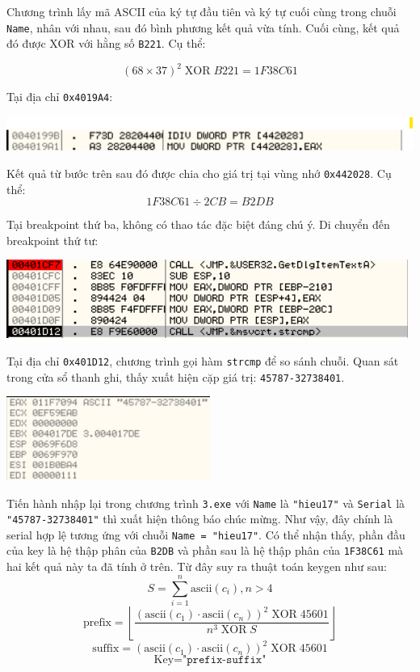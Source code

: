 Chương trình lấy mã ASCII của ký tự đầu tiên và ký tự cuối cùng trong chuỗi \texttt{Name}, nhân với nhau, sau đó bình phương kết quả vừa tính. Cuối cùng, kết quả đó được XOR với hằng số \texttt{B221}. Cụ thể:

\[
(68 \times 37)^2 \;\mathrm{XOR}\; B221 = 1F38C61
\]

Tại địa chỉ \texttt{0x4019A4}:

\begin{center}
    \includegraphics[width=\textwidth]{img/file-3/7.png}
\end{center}

Kết quả từ bước trên sau đó được chia cho giá trị tại vùng nhớ \texttt{0x442028}. Cụ thể: 
\[
    1F38C61 \div 2CB = B2DB
\] 

Tại breakpoint thứ ba, không có thao tác đặc biệt đáng chú ý. Di chuyển đến breakpoint thứ tư:

\begin{center}
    \includegraphics[width=\textwidth]{img/file-3/8.png}
\end{center}

Tại địa chỉ \texttt{0x401D12}, chương trình gọi hàm \texttt{strcmp} để so sánh chuỗi. Quan sát trong cửa sổ thanh ghi, thấy xuất hiện cặp giá trị: \texttt{45787-32738401}.

\begin{center}
    \includegraphics[width=0.5\textwidth]{img/file-3/9.png}
\end{center}

Tiến hành nhập lại trong chương trình \texttt{3.exe} với \texttt{Name} là \texttt{"hieu17"} và \texttt{Serial} là \texttt{"45787-32738401"} thì xuất hiện thông báo chúc mừng. Như vậy, đây chính là serial hợp lệ tương ứng với chuỗi \texttt{Name = "hieu17"}.
Có thể nhận thấy, phần đầu của key là hệ thập phân của \texttt{B2DB} và phần sau là hệ thập phân của \texttt{1F38C61} mà hai kết quả này ta đã tính ở trên.
Từ đây suy ra thuật toán keygen như sau:
\[
S = \sum_{i=1}^{n} \mathrm{ascii}(c_i), n > 4
\]
\[
\text{prefix} = \left\lfloor \dfrac{ \left( \mathrm{ascii}(c_1) \cdot \mathrm{ascii}(c_n) \right)^2 \;\mathrm{XOR}\; 45601 }{ n^3 \;\mathrm{XOR}\; S } \right\rfloor
\]
\[
\text{suffix} = \left( \mathrm{ascii}(c_1) \cdot \mathrm{ascii}(c_n) \right)^2 \;\mathrm{XOR}\; 45601
\]
\[
\text{Key} = \text{"}\texttt{prefix} \text{-} \texttt{suffix}\text{"}
\]

